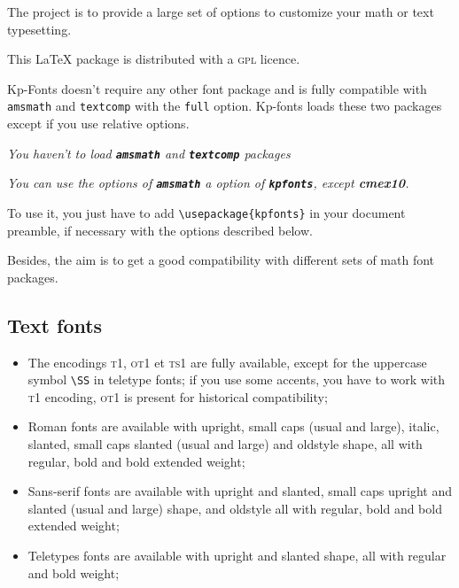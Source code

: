 \documentclass[a4paper,11pt]{article}
\begin{document}
\bigskip

The project is to provide a large set of options to customize your math or text typesetting.

\medskip

This LaTeX package is distributed with a \textsc{gpl} licence.

\medskip

Kp-Fonts doesn't require any other font package and is fully compatible with \texttt{amsmath} and \texttt{textcomp}
with the \texttt{full} option. Kp-fonts loads these two packages except if you use relative options.
 
\begin{center}
\textit{You haven't to load \textbf{\texttt{amsmath}} and \textbf{\texttt{textcomp}} packages}
\end{center}

\begin{center}\itshape
You can use the options of \textbf{\texttt{amsmath}} a option of \textbf{\texttt{kpfonts}}, except \textbf{cmex10}.
\end{center}

To use it, you just have to add \verb+\usepackage{kpfonts}+ in your document preamble, if necessary with the options described below.

Besides, the aim is to get a good compatibility with different sets of math font packages.

\subsection{Text fonts}

\begin{itemize}
  \item The encodings \textsc{t1, ot1} et \textsc {ts1} are fully available, except for the uppercase symbol \verb+\SS+ in teletype fonts; if you use some accents, you have to work with \textsc{t1} encoding, \textsc{ot1} is present for historical compatibility;
  \item Roman fonts are available with upright, small caps (usual and large), italic, slanted, small caps slanted (usual and large) and oldstyle shape, all with regular, bold and bold extended weight;
  \item Sans-serif fonts are available with upright and slanted, small caps upright and slanted (usual and large) shape, and oldstyle all with regular, bold and bold extended weight;
  \item Teletypes fonts are available with upright and slanted shape, all with regular and bold weight;
\end{itemize}
\end{document}
